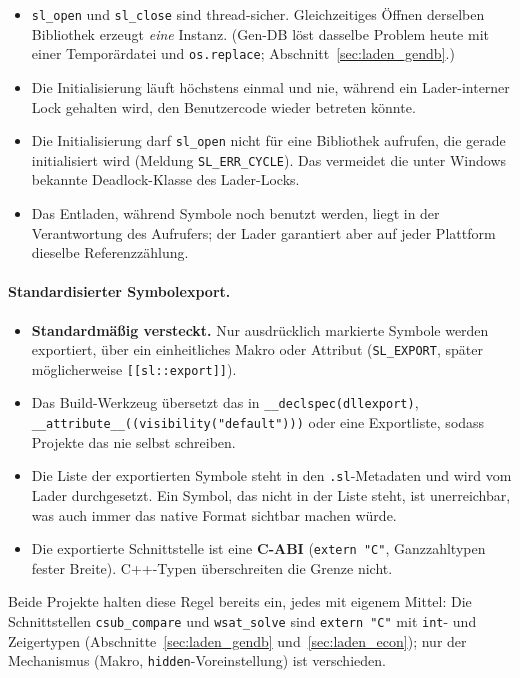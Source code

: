 \begin{itemize}
	\item \texttt{sl\_open} und \texttt{sl\_close} sind thread-sicher. Gleichzeitiges Öffnen derselben Bibliothek erzeugt \emph{eine} Instanz. (Gen-DB löst dasselbe Problem heute mit einer Temporärdatei und \texttt{os.replace}; Abschnitt~\ref{sec:laden_gendb}.)
	\item Die Initialisierung läuft höchstens einmal und nie, während ein Lader-interner Lock gehalten wird, den Benutzercode wieder betreten könnte.
	\item Die Initialisierung darf \texttt{sl\_open} nicht für eine Bibliothek aufrufen, die gerade initialisiert wird (Meldung \texttt{SL\_ERR\_CYCLE}). Das vermeidet die unter Windows bekannte Deadlock-Klasse des Lader-Locks.
	\item Das Entladen, während Symbole noch benutzt werden, liegt in der Verantwortung des Aufrufers; der Lader garantiert aber auf jeder Plattform dieselbe Referenzzählung.
\end{itemize}

\paragraph{Standardisierter Symbolexport.}

\begin{itemize}
	\item \textbf{Standardmäßig versteckt.} Nur ausdrücklich markierte Symbole werden exportiert, über ein einheitliches Makro oder Attribut (\texttt{SL\_EXPORT}, später möglicherweise \texttt{[[sl::export]]}).
	\item Das Build-Werkzeug übersetzt das in \texttt{\_\_declspec(dllexport)}, \texttt{\_\_attribute\_\_((visibility("default")))} oder eine Exportliste, sodass Projekte das nie selbst schreiben.
	\item Die Liste der exportierten Symbole steht in den \texttt{.sl}-Metadaten und wird vom Lader durchgesetzt. Ein Symbol, das nicht in der Liste steht, ist unerreichbar, was auch immer das native Format sichtbar machen würde.
	\item Die exportierte Schnittstelle ist eine \textbf{C-ABI} (\texttt{extern "C"}, Ganzzahltypen fester Breite). C++-Typen überschreiten die Grenze nicht.
\end{itemize}

Beide Projekte halten diese Regel bereits ein, jedes mit eigenem Mittel: Die Schnittstellen \texttt{csub\_compare} und \texttt{wsat\_solve} sind \texttt{extern "C"} mit \texttt{int}- und Zeigertypen (Abschnitte~\ref{sec:laden_gendb} und~\ref{sec:laden_econ}); nur der Mechanismus (Makro, \texttt{hidden}-Voreinstellung) ist verschieden.

